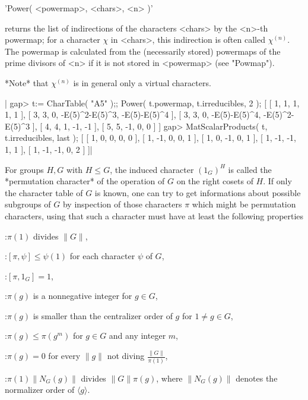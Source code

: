 
'Power( <powermap>, <chars>, <n> )'

returns the list of indirections of the characters  <chars> by the <n>-th
powermap;  for a character $\chi$  in  <chars>, this indirection is often
called $\chi^{(n)}$.   The powermap is  calculated from  the (necessarily
stored)  powermaps of the  prime divisors of  <n> if it  is not stored in
<powermap> (see "Powmap").

*Note* that $\chi^{(n)}$ is in general only a virtual characters.


|    gap> t:= CharTable( "A5" );; Power( t.powermap, t.irreducibles, 2 );
    [ [ 1, 1, 1, 1, 1 ], [ 3, 3, 0, -E(5)^2-E(5)^3, -E(5)-E(5)^4 ],
      [ 3, 3, 0, -E(5)-E(5)^4, -E(5)^2-E(5)^3 ], [ 4, 4, 1, -1, -1 ],
      [ 5, 5, -1, 0, 0 ] ]
    gap> MatScalarProducts( t, t.irreducibles, last );
    [ [ 1, 0, 0, 0, 0 ], [ 1, -1, 0, 0, 1 ], [ 1, 0, -1, 0, 1 ],
      [ 1, -1, -1, 1, 1 ], [ 1, -1, -1, 0, 2 ] ]|

%
%
%

For groups $H,  G$  with $H\leq G$, the  induced  character $(1_G)^H$  is
called the *permutation character*  of the operation of  $G$ on the right
cosets of $H$.  If only the character table of  $G$ is known, one can try
to  get informations about  possible  subgroups of  $G$  by inspection of
those characters $\pi$ which might be  permutation characters, using that
such a character must have at least the following properties\:

:$\pi(1)$ divides $\|G\|$,

:$[\pi,\psi]\leq\psi(1)$ for each character $\psi$ of $G$,

:$[\pi,1_G]=1$,

:$\pi(g)$ is a nonnegative integer for $g \in G$,

:$\pi(g)$ is smaller than the centralizer order of $g$ for
      $1\not= g\in G$,

:$\pi(g)\leq\pi(g^m)$ for $g\in G$ and any integer $m$,

:$\pi(g)=0$ for every $\|g\|$ not diving $\frac{\|G\|}{\pi(1)}$,

:$\pi(1) \|N_G(g)\|$ divides $\|G\| \pi(g)$, where $\|N_G(g)\|$ denotes
      the normalizer order of $\langle g \rangle$.

